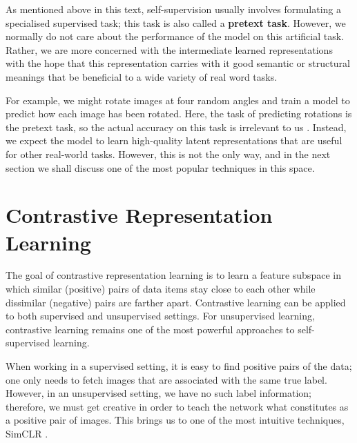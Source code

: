 As mentioned above in this text, self-supervision usually involves formulating a specialised supervised task; this task is also called a \textbf{pretext task}. However, we normally do not care about the performance of the model on this artificial task. Rather, we are more concerned with the intermediate learned representations with the hope that this representation carries with it good semantic or structural meanings that be beneficial to a wide variety of real word tasks.

For example, we might rotate images at four random angles and train a model to predict how each image has been rotated. Here, the task of predicting rotations is the pretext task, so the actual accuracy on this task is irrelevant to us \parencite{gidaris2018unsupervised}. Instead, we expect the model to learn high-quality latent representations that are useful for other real-world tasks. However, this is not the only way, and in the next section we shall discuss one of the most popular techniques in this space.

\section{Contrastive Representation Learning}\label{sec:contrastive-learning}
The goal of contrastive representation learning is to learn a feature subspace in which similar (positive) pairs of data items stay close to each other while dissimilar (negative) pairs are farther apart. Contrastive learning can be applied to both supervised and unsupervised settings. For unsupervised learning, contrastive learning remains one of the most powerful approaches to self-supervised learning.

When working in a supervised setting, it is easy to find positive pairs of the data; one only needs to fetch images that are associated with the same true label. However, in an unsupervised setting, we have no such label information; therefore, we must get creative in order to teach the network what constitutes as a positive pair of images. This brings us to one of the most intuitive techniques, SimCLR \parencite{chen2020simple}.

